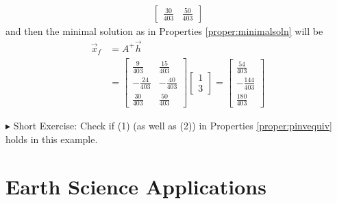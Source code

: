 \begin{solution}
\begin{align*}
\begin{bmatrix}
\frac{30}{403} & \frac{50}{403}
\end{bmatrix}
\end{align*}
and then the minimal solution as in Properties \ref{proper:minimalsoln} will be
\begin{align*}
\vec{x}_f &= A^+\vec{h} \\
&= \begin{bmatrix}
\frac{9}{403} & \frac{15}{403}\\ 
-\frac{24}{403} & -\frac{40}{403}\\ 
\frac{30}{403} & \frac{50}{403}
\end{bmatrix}
\begin{bmatrix}
1 \\
3
\end{bmatrix} =
\begin{bmatrix}
\frac{54}{403}\\ 
-\frac{144}{403}\\ 
\frac{180}{403}
\end{bmatrix}
\end{align*}
\end{solution}
$\blacktriangleright$ Short Exercise: Check if (1) (as well as (2)) in Properties \ref{proper:pinvequiv} holds in this example.\footnotemark

\section{Earth Science Applications}

